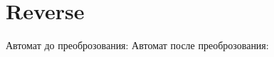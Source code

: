 \section{Reverse}
\begin{frame}{}
	Автомат до преоброзования:
	Автомат после преоброзования:
\end{frame}

